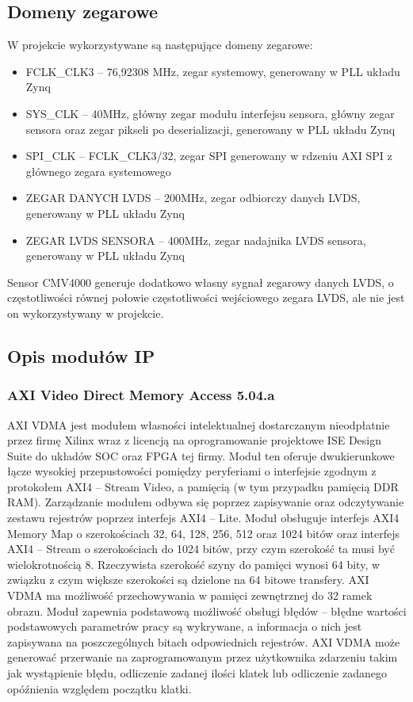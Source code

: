 \documentclass[a4paper,11pt,oneside]{report}  %
\begin{document}
\subsection{Domeny zegarowe} 

W projekcie wykorzystywane są następujące domeny zegarowe:
\begin{itemize}
\item FCLK\_CLK3 – 76,92308 MHz, zegar systemowy, generowany w PLL układu Zynq
\item SYS\_CLK – 40MHz, główny zegar modułu interfejsu sensora, główny zegar sensora oraz zegar pikseli po deserializacji, generowany w PLL układu Zynq
\item SPI\_CLK – FCLK\_CLK3/32, zegar SPI generowany w rdzeniu AXI SPI z głównego zegara systemowego
\item ZEGAR DANYCH LVDS – 200MHz, zegar odbiorczy danych LVDS, generowany w PLL układu Zynq
\item ZEGAR LVDS SENSORA – 400MHz, zegar nadajnika LVDS sensora, generowany w PLL układu Zynq
\end{itemize}

Sensor CMV4000 generuje dodatkowo własny sygnał zegarowy danych LVDS, o częstotliwości równej połowie częstotliwości wejściowego zegara LVDS, ale nie jest on wykorzystywany w projekcie.

\subsection{Opis modułów IP}
\subsubsection{AXI Video Direct Memory Access 5.04.a}
AXI VDMA jest modułem własności intelektualnej dostarczanym nieodpłatnie przez firmę Xilinx wraz z licencją na oprogramowanie projektowe ISE Design Suite do układów SOC oraz FPGA tej firmy. Moduł ten oferuje dwukierunkowe łącze wysokiej przepustowości pomiędzy peryferiami o interfejsie zgodnym z protokołem AXI4 – Stream Video, a pamięcią (w tym przypadku pamięcią DDR RAM). Zarządzanie modułem odbywa się poprzez zapisywanie oraz odczytywanie zestawu rejestrów poprzez interfejs AXI4 – Lite. Moduł obsługuje interfejs AXI4 Memory Map o szerokościach 32, 64, 128, 256, 512 oraz 1024 bitów oraz interfejs AXI4 – Stream o szerokościach do 1024 bitów, przy czym szerokość ta musi być wielokrotnością 8. Rzeczywista szerokość szyny do pamięci wynosi 64 bity, w związku z czym większe szerokości są dzielone na 64 bitowe transfery. AXI VDMA ma możliwość przechowywania w pamięci zewnętrznej do 32 ramek obrazu. Moduł zapewnia podstawową możliwość obsługi błędów – błędne wartości podstawowych parametrów pracy są wykrywane, a informacja o nich jest zapisywana na poszczególnych bitach odpowiednich rejestrów. AXI VDMA może generować przerwanie na zaprogramowanym przez użytkownika zdarzeniu takim jak wystąpienie błędu, odliczenie zadanej ilości klatek lub odliczenie zadanego opóźnienia względem początku klatki.
\end{document}
